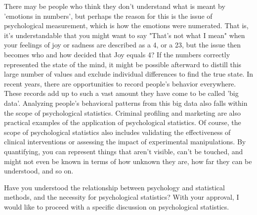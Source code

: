 \documentclass{ltjsbook}
\begin{document}
There may be people who think they don't understand what is meant by 'emotions in numbers', but perhaps the reason for this is the issue of psychological measurement, which is how the emotions were numerated. That is, it's understandable that you might want to say "That's not what I mean" when your feelings of joy or sadness are described as a 4, or a 23, but the issue then becomes who and how decided that Joy equals 4? If the numbers correctly represented the state of the mind, it might be possible afterward to distill this large number of values and exclude individual differences to find the true state. In recent years, there are opportunities to record people's behavior everywhere. These records add up to such a vast amount they have come to be called 'big data'. Analyzing people's behavioral patterns from this big data also falls within the scope of psychological statistics. Criminal profiling and marketing are also practical examples of the application of psychological statistics. Of course, the scope of psychological statistics also includes validating the effectiveness of clinical interventions or assessing the impact of experimental manipulations. By quantifying, you can represent things that aren't visible, can't be touched, and might not even be known in terms of how unknown they are, how far they can be understood, and so on.

Have you understood the relationship between psychology and statistical methods, and the necessity for psychological statistics? With your approval, I would like to proceed with a specific discussion on psychological statistics.
\end{document}
